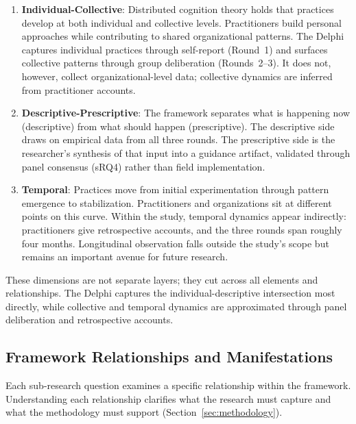 \begin{enumerate}
      \item \textbf{Individual-Collective}: Distributed cognition theory
            \parencite{hutchins_cognition_1995} holds that practices develop at both
            individual and collective levels. Practitioners build personal approaches
            while contributing to shared organizational patterns. The Delphi captures
            individual practices through self-report (Round~1) and surfaces collective
            patterns through group deliberation (Rounds~2--3). It does not, however,
            collect organizational-level data; collective dynamics are inferred from
            practitioner accounts.
      \item \textbf{Descriptive-Prescriptive}: The framework separates what is
            happening now (descriptive) from what should happen (prescriptive). The
            descriptive side draws on empirical data from all three rounds. The
            prescriptive side is the researcher's synthesis of that input into a
            guidance artifact, validated through panel consensus (sRQ4) rather than
            field implementation.
      \item \textbf{Temporal}: Practices move from initial experimentation through
            pattern emergence to stabilization. Practitioners and organizations sit at
            different points on this curve. Within the study, temporal dynamics appear
            indirectly: practitioners give retrospective accounts, and the three
            rounds span roughly four months. Longitudinal observation falls outside
            the study's scope but remains an important avenue for future research.
\end{enumerate}

These dimensions are not separate layers; they cut across all elements and
relationships. The Delphi captures the individual-descriptive intersection most
directly, while collective and temporal dynamics are approximated through panel
deliberation and retrospective accounts.

\subsection{Framework Relationships and Manifestations}\label{subsec:framework-relationships}

Each sub-research question examines a specific relationship within the
framework. Understanding each relationship clarifies what the research must
capture and what the methodology must support
(Section~\ref{sec:methodology}).

